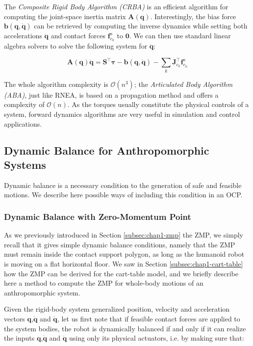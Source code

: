 The \emph{Composite Rigid Body Algorithm (CRBA)} is an efficient
algorithm for computing the joint-space inertia matrix
$\mathbf{A}(\mathbf{q})$. Interestingly, the bias force
$\mathbf{b}(\mathbf{q},\dot{\mathbf{q}})$ can be retrieved by computing the
inverse dynamics while setting both accelerations $\ddot{\mathbf{q}}$
and contact forces $\mathbf{f}^s_{c_k}$ to $\mathbf{0}$. We can then
use standard linear algebra solvers to solve the following system for
$\ddot{\mathbf{q}}$:

\begin{equation}
  \mathbf{A}(\mathbf{q})\ddot{\mathbf{q}} =
  \mathbf{S}^\top\boldsymbol{\tau} -
  \mathbf{b}(\mathbf{q},\dot{\mathbf{q}}) -
  \sum_k\mathbf{J}_{c_k}^\top\mathbf{f}^s_{c_k}
\end{equation}

The whole algorithm complexity is $\mathcal{O}(n^3)$; the
\emph{Articulated Body Algorithm (ABA)}, just like RNEA, is based on a
propagation method and offers a complexity of $\mathcal{O}(n)$. As the
torques usually constitute the physical controls of a system, forward
dynamics algorithms are very useful in simulation and control
applications.

\subsection{Dynamic Balance for Anthropomorphic Systems}

Dynamic balance is a necessary condition to the generation of safe and
feasible motions. We describe here possible ways of including this
condition in an OCP.

\subsubsection{Dynamic Balance with Zero-Momentum Point}

As we previously introduced in Section \ref{subsec:chap1-zmp} the ZMP,
we simply recall that it gives simple dynamic balance conditions,
namely that the ZMP must remain inside the contact support polygon, as
long as the humanoid robot is moving on a flat horizontal floor. We
saw in Section \ref{subsec:chap1-cart-table} how the ZMP can be
derived for the cart-table model, and we briefly describe here a
method to compute the ZMP for whole-body motions of an anthropomorphic
system.

Given the rigid-body system generalized position, velocity and
acceleration vectors $\mathbf{q}$,$\dot{\mathbf{q}}$ and
$\ddot{\mathbf{q}}$, let us first note that if feasible contact forces
are applied to the system bodies, the robot is dynamically balanced if
and only if it can realize the inputs $\mathbf{q}$,$\dot{\mathbf{q}}$
and $\ddot{\mathbf{q}}$ using only its physical actuators, i.e. by
making sure that:

